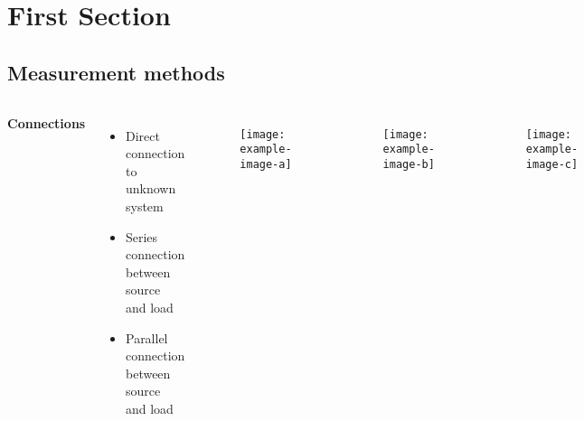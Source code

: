 \documentclass{beamer}
\begin{document}
\section{First Section} 

\subsection{Measurement methods}
\begin{frame}

\begin{columns}[b]
    \textbf{Connections}
    \begin{itemize}
        \item Direct connection to unknown system
        \item Series connection between source and load
        \item Parallel connection between source and load 
    \end{itemize}
    \vspace{\fill}
    \null
    \vfill
    \begin{figure}
         \centering
         \texttt{[image: example-image-a]}
        \caption{}
        \label{fig:imu}
    \end{figure}

    \begin{figure}
         \centering
         \texttt{[image: example-image-b]}
        \caption{}
        \label{fig:voltage}
    \end{figure}
    \begin{figure}
         \centering
         \texttt{[image: example-image-c]}
        \caption{}
        \label{fig:current}
    \end{figure}

\end{columns}
\end{frame}
\end{document}
